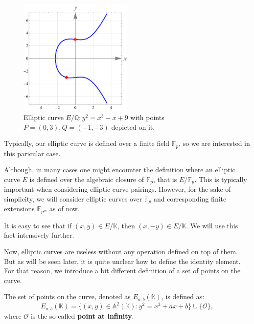 \documentclass[../lecture-notes-148x210.tex]{subfiles}
\begin{document}
\begin{figure}[h!]
    \centering
    \includegraphics[width=0.5\textwidth]{images/lecture_3/ec_illustration_1.pdf}
    \caption{Elliptic curve $E/\mathbb{Q}: y^2=x^3-x+9$ with points $P=(0,3),Q=(-1,-3)$ depicted on it.}
    \label{fig:ec_1}
\end{figure}

Typically, our elliptic curve is defined over a finite field $\mathbb{F}_p$, so we are interested in this paricular case. 

\begin{remark}
    Although, in many cases one might encounter the definition where an elliptic curve $E$ is defined over the algebraic closure of $\mathbb{F}_p$, that is $E/\overline{\mathbb{F}}_p$. This is typically important when considering elliptic curve pairings. However, for the sake of simplicity, we will consider elliptic curves over $\mathbb{F}_p$ and corresponding finite extensions $\mathbb{F}_{p^m}$ as of now.
\end{remark}

\begin{remark}
    It is easy to see that if $(x,y) \in E/\mathbb{K}$, then $(x,-y) \in E/\mathbb{K}$. We will use this fact intensively further.
\end{remark}

Now, elliptic curves are useless without any operation defined on top of them. But as will be seen later, it is quite unclear how to define the identity element. For that reason, we introduce a bit different definition of a set of points on the curve.

\begin{definition}
    The set of points on the curve, denoted as $E_{a,b}(\mathbb{K})$, is defined as:
    \begin{equation*}
        E_{a,b}(\mathbb{K}) = \{(x,y) \in \mathbb{A}^2(\mathbb{K}): y^2=x^3+ax+b\} \cup \{\mathcal{O}\},
    \end{equation*}
    where $\mathcal{O}$ is the so-called \textbf{point at infinity}.
\end{definition}
\end{document}
